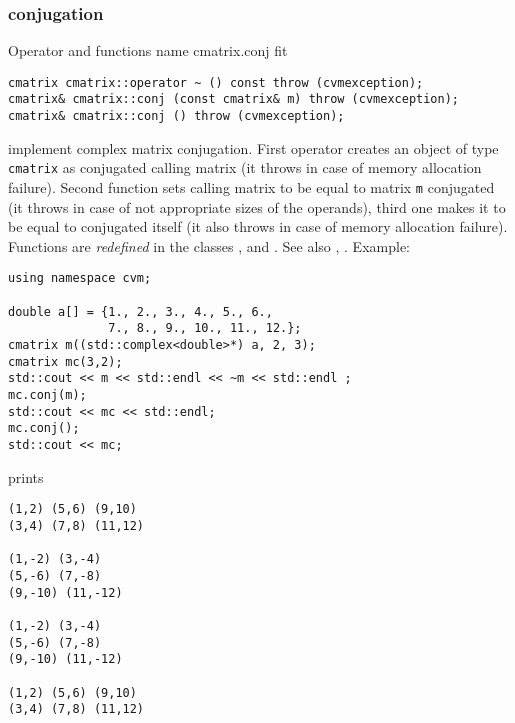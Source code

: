\subsubsection{conjugation}
Operator and functions%
\pdfdest name {cmatrix.conj} fit
\begin{verbatim}
cmatrix cmatrix::operator ~ () const throw (cvmexception);
cmatrix& cmatrix::conj (const cmatrix& m) throw (cvmexception);
cmatrix& cmatrix::conj () throw (cvmexception);
\end{verbatim}
implement complex matrix conjugation.
First operator creates an object of type \verb"cmatrix" as
 conjugated calling matrix
(it throws  
in case of memory allocation failure). 
Second function sets  calling matrix to be equal to  matrix
\verb"m" conjugated
(it throws  
in case of not appropriate sizes of the operands), 
third one makes it to be equal to
conjugated itself (it also throws  
in case of memory allocation failure). 
Functions are \emph{redefined} in the classes
,  
and .
See also , .
Example:
\begin{Verbatim}
using namespace cvm;

double a[] = {1., 2., 3., 4., 5., 6.,
              7., 8., 9., 10., 11., 12.};
cmatrix m((std::complex<double>*) a, 2, 3);
cmatrix mc(3,2);
std::cout << m << std::endl << ~m << std::endl ;
mc.conj(m);
std::cout << mc << std::endl;
mc.conj();
std::cout << mc;
\end{Verbatim}
prints
\begin{Verbatim}
(1,2) (5,6) (9,10)
(3,4) (7,8) (11,12)

(1,-2) (3,-4)
(5,-6) (7,-8)
(9,-10) (11,-12)

(1,-2) (3,-4)
(5,-6) (7,-8)
(9,-10) (11,-12)

(1,2) (5,6) (9,10)
(3,4) (7,8) (11,12)
\end{Verbatim}
\newpage




